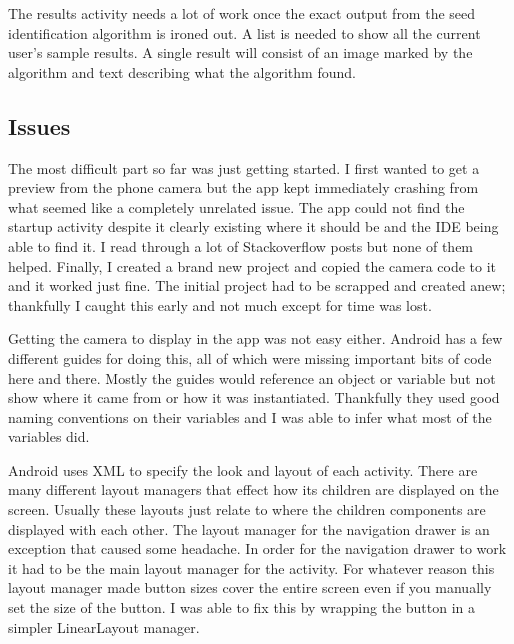 \documentclass[onecolumn, draftclsnofoot,10pt, compsoc]{IEEEtran}
\begin{document}
		The results activity needs a lot of work once the exact output from the seed identification algorithm is ironed out.
		A list is needed to show all the current user's sample results.
		A single result will consist of an image marked by the algorithm and text describing what the algorithm found.

	\subsection{Issues}
		The most difficult part so far was just getting started.
		I first wanted to get a preview from the phone camera but the app kept immediately crashing from what seemed like a completely unrelated issue.
		The app could not find the startup activity despite it clearly existing where it should be and the IDE being able to find it.
		I read through a lot of Stackoverflow posts but none of them helped.
		Finally, I created a brand new project and copied the camera code to it and it worked just fine.
		The initial project had to be scrapped and created anew; thankfully I caught this early and not much except for time was lost.
		
		Getting the camera to display in the app was not easy either.
		Android has a few different guides for doing this, all of which were missing important bits of code here and there.
		Mostly the guides would reference an object or variable but not show where it came from or how it was instantiated.
		Thankfully they used good naming conventions on their variables and I was able to infer what most of the variables did.

		Android uses XML to specify the look and layout of each activity.
		There are many different layout managers that effect how its children are displayed on the screen.
		Usually these layouts just relate to where the children components are displayed with each other.
		The layout manager for the navigation drawer is an exception that caused some headache.
		In order for the navigation drawer to work it had to be the main layout manager for the activity.
		For whatever reason this layout manager made button sizes cover the entire screen even if you manually set the size of the button.
		I was able to fix this by wrapping the button in a simpler LinearLayout manager.



\end{document}
